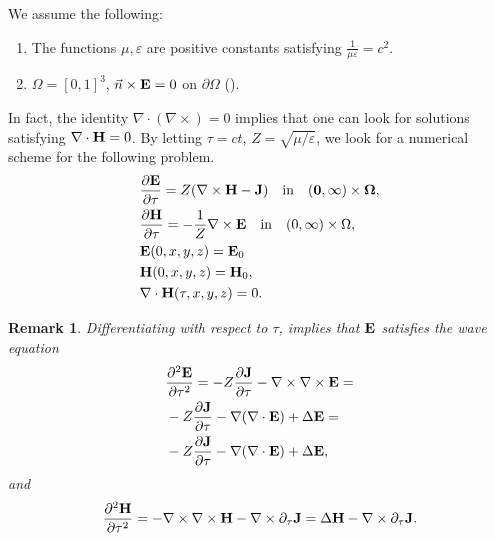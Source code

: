 \documentclass[12pt,reqno]{amsart}
\newcommand{\e}{{\bf E}}
\newcommand{\h}{{\bf H}}
\newcommand{\J}{{\bf J}}
\newtheorem{remark}[theorem]{Remark}
\newtheorem{rem}[theorem]{Remark}
\theoremstyle{definition}
\numberwithin{equation}{section}
\begin{document}
We assume the following:
\begin{enumerate}
	\item  The functions $\mu,\varepsilon$ are    positive constants satisfying $\frac{1}{\mu \varepsilon}=c^2$.
	\item  $\Omega=[0,1]^3$, $\vec{n} \times {\bf E}=0$ on $\partial \Omega$ (\cite[Section 8]{rolf}).
\end{enumerate}
In fact, the identity $\nabla\cdot (\nabla\times)=0$ implies that one can look for solutions  satisfying $\nabla\cdot \h=0$.
By letting  $ \tau=ct$,  $Z=\sqrt{\mu/\varepsilon}$, we look for a numerical scheme for the following problem.
	\begin{align}
	\label{eq:maxwellv}
	&\notag
\frac{\partial {\bf E}}{\partial \tau }=Z(\nabla \times \bf{H}-{\bf J}) \quad \mathrm{in} \quad  (0,\infty)\times \Omega,\\&\notag
 \frac{\partial {\bf H}}{\partial \tau }=-\frac{1}{Z}\nabla \times {\bf E} \quad \mathrm{in} \quad  (0,\infty)\times \Omega,\\&\notag
 \e(0,x,y,z)=\e_0 \\& \h(0,x,y,z)=\h_0,\\&\notag
	\nabla\cdot \h(\tau,x,y,z) = 0.\notag
\end{align}
\begin{rem}\label{rem:wave_e}
	Differentiating with respect to $\tau$, implies that $\e$ satisfies the wave equation
	\begin{align*}
		&
	\frac{\partial^2 \e}{\partial \tau^2}=-Z\frac{\partial \J}{\partial \tau}-\nabla\times
\nabla\times \e=\\&
-Z\frac{\partial \J}{\partial \tau}-\nabla(\nabla \cdot \e)+\Delta \e=\\&
-Z\frac{\partial \J}{\partial \tau}-\nabla(\nabla \cdot \e)+\Delta \e,
	\end{align*}
and 
$$
\frac{\partial^2 \h}{\partial \tau^2}=-\nabla \times \nabla \times\h-\nabla \times \partial_{\tau}\J=
\Delta \h-\nabla \times \partial_{\tau}\J.
$$

\end{rem}




\end{document}
